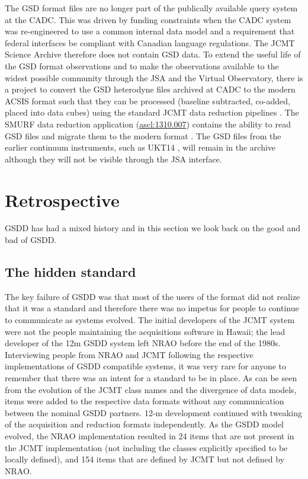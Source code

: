 \documentclass[final,authoryear,5p,times,twocolumn]{elsarticle}
\newcommand{\ascl}[1]{\href{http://www.ascl.net/#1}{ascl:#1}}
\begin{document}
The GSD format files are no longer part of the publically available
query system at the CADC. This was driven by funding constraints when
the CADC system was re-engineered to use a common internal data model
\citep{2013ASPC..475..159R} and a requirement that federal interfaces
be compliant with Canadian language regulations. The JCMT Science
Archive \citep[JSA;][]{2015Economou} therefore does not contain GSD
data.  To extend the useful life of the GSD format observations and to
make the observations available to the widest possible community
through the JSA and the Virtual Observatory, there is a project to
convert the GSD heterodyne files archived at CADC to the modern ACSIS
format \citep{OCS_ICD_022} such that they can be processed (baseline
subtracted, co-added, placed into data cubes) using the
standard JCMT data reduction pipelines
\citep{2015ACSISDR,2008ASPC..394..565J}. The SMURF data reduction
application (\ascl{1310.007}\nocite{2013ascl.soft10007J}) contains the
ability to read GSD files and migrate them to the modern format
\citep{SUN259}.  The GSD files from the earlier continuum instruments,
such as UKT14 \citep{1990MNRAS.243..126D}, will remain in the archive
although they will not be visible through the JSA interface.

\section{Retrospective}

GSDD has had a mixed history and in this section we look back on the
good and bad of GSDD.

\subsection{The hidden standard}
\label{sec:hidden}

The key failure of GSDD was that most of the users of the format did
not realize that it was a standard and therefore there was no
impetus for people to continue to communicate as systems
evolved. The initial developers of the JCMT system were not the people
maintaining the acquisitions software in Hawaii; the lead developer of
the 12m GSDD system left NRAO before the end of the 1980s.
Interviewing people from NRAO and JCMT following the
respective implementations of GSDD compatible systems, it was very rare
for anyone to remember that there was an intent for a standard to be
in place. As can be seen from the evolution of the JCMT class names
and the divergence of data models, items were added to the respective
data formats without any communication between the nominal GSDD
partners. 12-m development continued with tweaking of the acquisition
and reduction formats independently.  As the GSDD model evolved, the
NRAO implementation resulted in 24 items that are not present in the
JCMT implementation (not including the classes explicitly specified to
be locally defined), and 154 items that are defined by JCMT but not
defined by NRAO.
\end{document}
